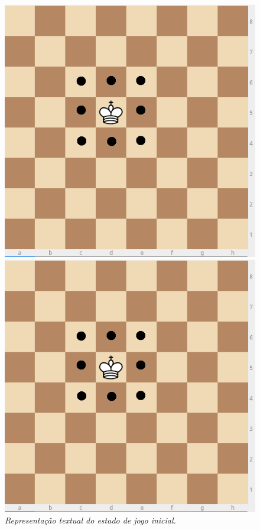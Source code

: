 \documentclass[a4paper]{article}
\begin{document}
\begin{tiny}
\begin{figure}[H]
\includegraphics[scale=0.2]{board1.png}
\caption{\textit{Representação textual do estado de jogo inicial.}}
\label{fig:fig5}
\endminipage\hfill
{}
\includegraphics[scale=0.2]{board1.png}

\end{figure}
\end{tiny}
\end{document}
